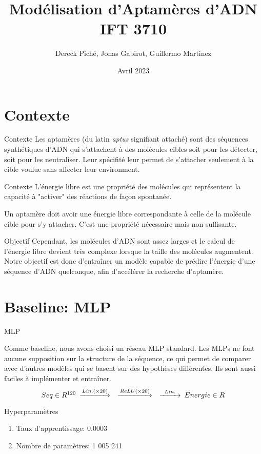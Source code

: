 \documentclass{beamer}
\title{Modélisation d'Aptamères d'ADN IFT 3710}
\author{Dereck Piché, Jonas Gabirot, Guillermo Martinez}
\institute{Université de Montréal}
\date{Avril 2023}
\begin{document}
\frame{\titlepage}

\section{Contexte}

\begin{frame}{Contexte}
Les aptamères (du latin \emph{aptus} signifiant attaché) sont des séquences synthétiques d'ADN qui s'attachent à des molécules cibles soit pour les détecter, soit pour les neutraliser. Leur spécifité leur permet de s'attacher seulement à la cible voulue sans affecter leur environment.
\end{frame}


\begin{frame}{Contexte}
L'énergie libre est une propriété des molécules qui représentent la capacité à "activer" des réactions de façon spontanée. 

Un aptamère doit avoir une énergie libre correspondante à celle de la molécule cible pour s'y attacher. C'est une propriété nécessaire mais non suffisante.
\end{frame}


\begin{frame}{Objectif}
Cependant, les molécules d'ADN sont assez larges et le calcul de l'énergie libre devient très complexe lorsque la taille des molécules augmentent. Notre objectif est donc d'entraîner un modèle capable de prédire l'énergie d'une séquence d'ADN quelconque, afin d'accélérer la recherche d'aptamère.
\end{frame}


\section{Baseline: MLP}
\begin{frame}{MLP}

Comme baseline, nous avons choisi un réseau MLP standard. Les MLPs ne font aucune supposition sur la structure de la séquence, ce qui permet de comparer avec d'autres modèles qui se basent sur des hypothèses différentes. Ils sont aussi faciles à implémenter et entraîner. 
\begin{equation*}
    \begin{CD}
        @. Seq \in R^{120}
        @>Lin. (\times 20)>> 
        @>ReLU (\times 20)>> 
        @>Lin.>> 
        Energie \in R
    \end{CD}
\end{equation*}

\begin{block}{Hyperparamètres}
\begin{enumerate}
    \item Taux d'apprentissage: 0.0003
    \item Nombre de paramètres: 1 005 241
\end{enumerate}
\end{block}

\end{frame}
\end{document}
